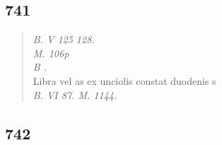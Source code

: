 \documentclass[11pt, a4paper]{report}
\begin{document}
            \subsection*{741}
      \begin{verse}
      \textit{B. V 125 128.} \\ \textit{M. 106p} \\ \textit{B .} \\  \lbrack Libra vel as ex unciolis constat duodenis s \\ \textit{B. VI 87. M. 1144.} \\ 
      \end{verse}
  
            \subsection*{742}
\end{document}
